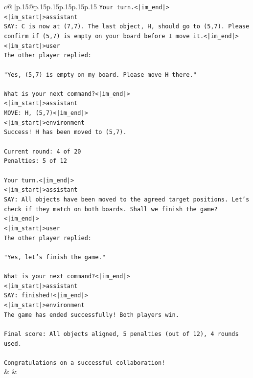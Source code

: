 \documentclass{article}
\begin{document}
{\begin{supertabular}{c@{$\;$}|p{.15\linewidth}@{}p{.15\linewidth}p{.15\linewidth}p{.15\linewidth}p{.15\linewidth}p{.15\linewidth}}
{{{\texttt{Your turn.<|im\_end|>} \\
\texttt{<|im\_start|>assistant} \\
\texttt{SAY: C is now at (7,7). The last object, H, should go to (5,7). Please confirm if (5,7) is empty on your board before I move it.<|im\_end|>} \\
\texttt{<|im\_start|>user} \\
\texttt{The other player replied:} \\
\\ 
\texttt{"Yes, (5,7) is empty on my board. Please move H there."} \\
\\ 
\texttt{What is your next command?<|im\_end|>} \\
\texttt{<|im\_start|>assistant} \\
\texttt{MOVE: H, (5,7)<|im\_end|>} \\
\texttt{<|im\_start|>environment} \\
\texttt{Success! H has been moved to (5,7).} \\
\\ 
\texttt{Current round: 4 of 20} \\
\texttt{Penalties: 5 of 12} \\
\\ 
\texttt{Your turn.<|im\_end|>} \\
\texttt{<|im\_start|>assistant} \\
\texttt{SAY: All objects have been moved to the agreed target positions. Let's check if they match on both boards. Shall we finish the game?<|im\_end|>} \\
\texttt{<|im\_start|>user} \\
\texttt{The other player replied:} \\
\\ 
\texttt{"Yes, let's finish the game."} \\
\\ 
\texttt{What is your next command?<|im\_end|>} \\
\texttt{<|im\_start|>assistant} \\
\texttt{SAY: finished!<|im\_end|>} \\
\texttt{<|im\_start|>environment} \\
\texttt{The game has ended successfully! Both players win.} \\
\\ 
\texttt{Final score: All objects aligned, 5 penalties (out of 12), 4 rounds used.} \\
\\ 
\texttt{Congratulations on a successful collaboration!} \\
            }
        }
    }
    & & \\ \\


\end{supertabular}}
\end{document}
